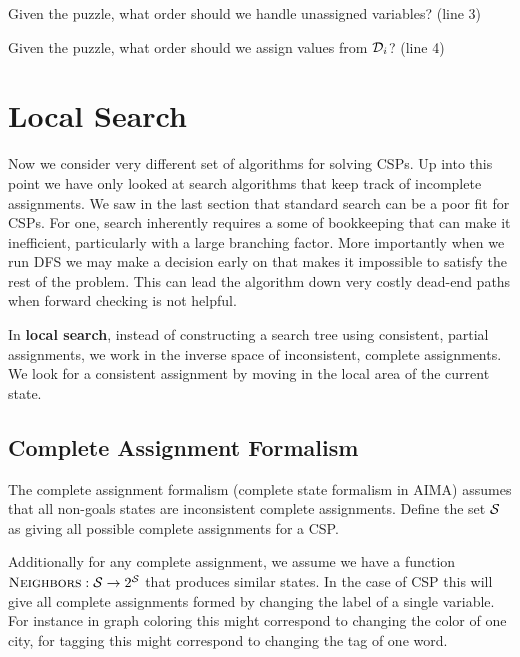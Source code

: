 \documentclass[11pt]{article}
\begin{document}
\begin{exercise}
  Given the puzzle, what order should we handle unassigned variables? (line 3)
\end{exercise}


\begin{exercise}
  Given the puzzle, what order should we assign values from $\mathcal{D}_i$? (line 4)
\end{exercise}

\section{Local Search}



Now we consider very different set of algorithms for solving CSPs. Up
into this point we have only looked at search algorithms that keep
track of incomplete assignments.  We saw in the last section that
standard search can be a poor fit for CSPs. For one, search inherently
requires a some of bookkeeping that can make it inefficient,
particularly with a large branching factor. More importantly when we
run DFS we may make a decision early on that makes it impossible to
satisfy the rest of the problem. This can lead the algorithm down very
costly dead-end paths when forward checking is not helpful.

In \textbf{local search}, instead of constructing a search tree using
consistent, partial assignments, we work in the inverse space of inconsistent,
complete assignments. We look for a consistent assignment by moving in
the local area of the current state.

\subsection{Complete Assignment Formalism}

The complete assignment formalism (complete state formalism in AIMA)  assumes that all non-goals states are inconsistent
complete assignments. Define the set $\mathcal{S}$ as giving all possible
complete assignments for a CSP.

Additionally for any complete assignment, we assume we have a function $\mathrm{\textsc{Neighbors}} : \mathcal{S} \rightarrow 2^{\mathcal{S}}$ that produces similar states. In the case of CSP this will give all complete assignments formed by changing the label of a single variable. For instance in graph coloring this might correspond to changing the color of one city, for tagging this might correspond to changing the tag of one word. 
\end{document}
